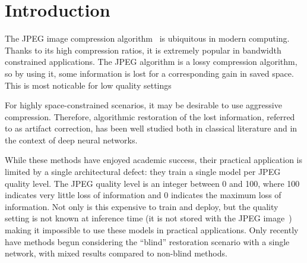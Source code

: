 \documentclass[runningheads]{llncs}
\begin{document}
\section{Introduction}

The JPEG image compression algorithm~\cite{wallace1992jpeg} is ubiquitous in modern computing. Thanks to 
its high compression ratios, it is extremely popular in bandwidth constrained applications. The JPEG algorithm is a lossy compression algorithm, so by 
using it, some information is lost for a corresponding gain in saved space. This is most noticable for low quality settings 

For highly space-constrained scenarios, it may be desirable to use aggressive compression. Therefore, 
algorithmic restoration of the lost information, referred to as artifact correction, has been well studied both in classical literature and in the context of deep neural networks.

While these methods have enjoyed academic success, their practical application is limited by a single 
architectural defect:  
they train a single model per JPEG quality level. The JPEG quality level is an 
integer between 0 and 100, where 100 indicates very little loss of information and 0 
indicates the maximum loss of information. Not only is this expensive to train and deploy, but the quality setting is not known at inference time (it 
is not stored with the JPEG image~\cite{wallace1992jpeg}) making it impossible to use these models in 
practical applications. Only recently have methods begun considering the ``blind'' restoration scenario \cite{kim2019pseudo, kim2020agarnet} with a single network, with mixed results compared to non-blind methods.
\end{document}
